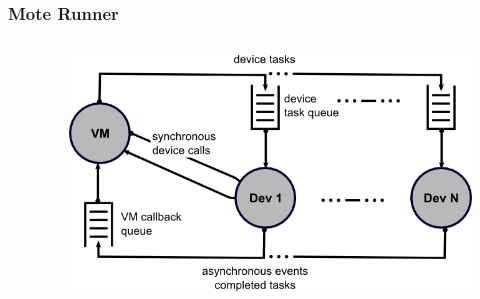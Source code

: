 \documentclass[12pt, compress]{beamer}
\begin{document}
\begin{frame}[fragile]
  \frametitle{Mote Runner}
  \begin{columns}
    \begin{column}{.48\linewidth}
    	
    \end{column}
    \hfill
    \begin{column}{.5\linewidth}
    	\begin{figure}
	  \centering
	  \includegraphics[width=\textwidth]{img/vm-dev.jpg}
    	\end{figure}
    \end{column}
  \end{columns}
\end{frame}
\end{document}
